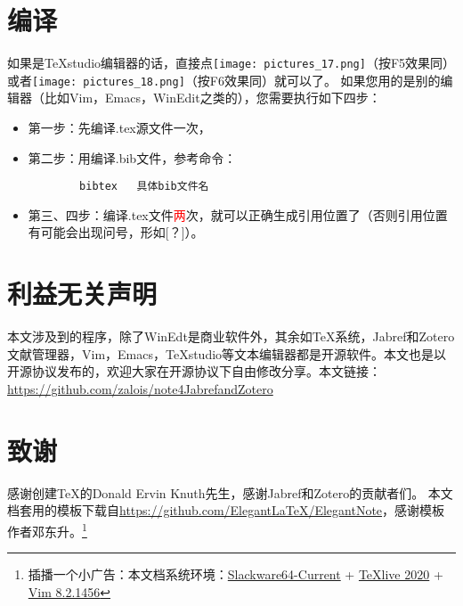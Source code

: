 \documentclass[cn,geye,cyan,normal,14pt]{elegantnote}
\begin{document}
\section{编译}
如果是\TeX studio编辑器的话，直接点\texttt{[image: pictures\_17.png]}（按F5效果同）或者\texttt{[image: pictures\_18.png]}（按F6效果同）就可以了。
如果您用的是别的编辑器（比如Vim，Emacs，WinEdit之类的），您需要执行如下四步\cite[第 380 页]{胡伟2013LATEX}：
\begin{itemize}
	\item 第一步：先编译.tex源文件一次，
	\item 第二步：用\BibTeX 编译.bib文件，参考命令：
		\begin{lstlisting}
		bibtex   具体bib文件名
		\end{lstlisting}
	\item 第三、四步：编译.tex文件\textcolor{red}{两}次，就可以正确生成引用位置了（否则引用位置有可能会出现问号，形如[？]）。
\end{itemize}
\section{利益无关声明}
本文涉及到的程序，除了WinEdt是商业软件外，其余如\TeX 系统，Jabref和Zotero文献管理器，Vim，Emacs，\TeX studio等文本编辑器都是开源软件。本文也是以开源协议发布的，欢迎大家在开源协议下自由修改分享。本文链接：\url{https://github.com/zalois/note4JabrefandZotero}
\section{致谢}
感谢创建\TeX 的Donald Ervin Knuth先生，感谢Jabref和Zotero的贡献者们。
本文档套用的模板下载自\href{https://github.com/ElegantLaTeX/ElegantNote}{https://github.com/Elegant\LaTeX/ElegantNote}，感谢模板作者邓东升。\footnote{插播一个小广告：本文档系统环境：\href{https://mirrors.slackware.com/slackware/slackware64-current/}{Slackware64-Current} + \href{https://www.tug.org/texlive/}{\TeX live 2020} + \href{https://www.vim.org/}{Vim 8.2.1456}}
%

\end{document}
